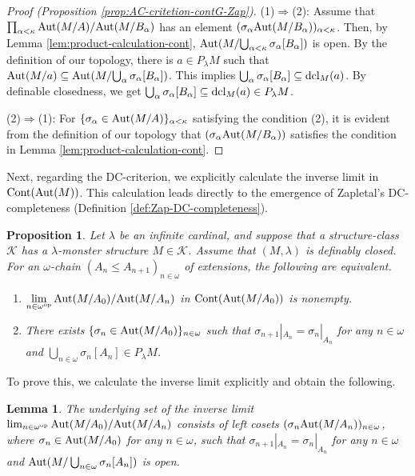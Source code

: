 \documentclass[10pt]{amsart}
\numberwithin{equation}{section}
\theoremstyle{plain}
\newtheorem{lemma}[theorem]{Lemma}
\newtheorem{prop}[theorem]{Proposition}
\theoremstyle{definition}
\newcommand{\om}{\omega}
\newcommand{\K}{\mathcal{K}}
\begin{document}
\begin{proof}[Proof (Proposition \ref{prop:AC-critetion-contG-Zap})]
(1)$\Rightarrow$(2):
Assume that $\prod_{\alpha<\kappa}{\rm Aut}(M/A)/{\rm Aut}(M/{B_\alpha})$ has an element $(\sigma_\alpha {\rm Aut}(M/{B_\alpha}))_{\alpha<\kappa}$.
Then, by Lemma \ref{lem:product-calculation-cont}, ${\rm Aut}(M/{\bigcup_{\alpha<\kappa}\sigma_\alpha[B_\alpha]})$ is open.
By the definition of our topology, there is $a\in P_\lambda M$ such that ${\rm Aut}(M/a)\subseteq {\rm Aut}(M/{\bigcup_\alpha\sigma_\alpha[B_\alpha]})$.
This implies $\bigcup_\alpha\sigma_\alpha[B_\alpha]\subseteq {\rm dcl}_M(a)$.
By definable closedness, we get $\bigcup_\alpha\sigma_\alpha[B_\alpha]\subseteq{\rm dcl}_M(a)\in P_\lambda M$.

(2)$\Rightarrow$(1):
For $\{\sigma_\alpha \in {\rm Aut}(M/A)\}_{\alpha<\kappa}$ satisfying the condition (2), it is evident from the definition of our topology that $(\sigma_\alpha {\rm Aut}(M/{B_\alpha}))$ satisfies the condition in Lemma \ref{lem:product-calculation-cont}.
\end{proof}

Next, regarding the DC-criterion, we explicitly calculate the inverse limit in ${\rm Cont}({\rm Aut}(M))$.
This calculation leads directly to the emergence of Zapletal's DC-completeness (Definition \ref{def:Zap-DC-completeness}).

\begin{prop}\label{prop:DC-critetion-contG-Zap}
Let $\lambda$ be an infinite cardinal, and suppose that a structure-class $\K$ has a $\lambda$-monster structure $M\in\K$.
Assume that $(M,\lambda)$ is definably closed.
For an $\omega$-chain $(A_n\leq A_{n+1})_{n\in\om}$ of extensions, the following are equivalent.
\begin{enumerate}
\item $\displaystyle{\lim_{n\in\om^{\rm op}}{\rm Aut}(M/A_0)/{\rm Aut}(M/{A_n})}$  in ${\rm Cont}({\rm Aut}(M/A_0))$ is nonempty.
\item There exists $\{\sigma_n\in {\rm Aut}(M/A_0)\}_{n\in\om}$ such that $\sigma_{n+1}|_{A_n}=\sigma_n|_{A_n}$ for any $n\in\om$ and $\bigcup_{n\in\om}\sigma_n[A_n]\in P_\lambda M$.
\end{enumerate}
\end{prop}

To prove this, we calculate the inverse limit explicitly and obtain the following.

\begin{lemma}\label{lem:inverse-limit-calculation-cont}
The underlying set of the inverse limit $\lim_{n\in\om^{\rm op}}{\rm Aut}(M/A_0)/{\rm Aut}(M/A_n)$ consists of left cosets $(\sigma_n{\rm Aut}(M/A_n))_{n\in\om}$, where $\sigma_n\in {\rm Aut}(M/A_0)$ for any $n\in\om$, such that $\sigma_{n+1}|_{A_n}=\sigma_n|_{A_n}$ for any $n\in\om$ and ${\rm Aut}(M/\bigcup_{n\in\om}\sigma_n[A_n])$ is open.
\end{lemma}
\end{document}
